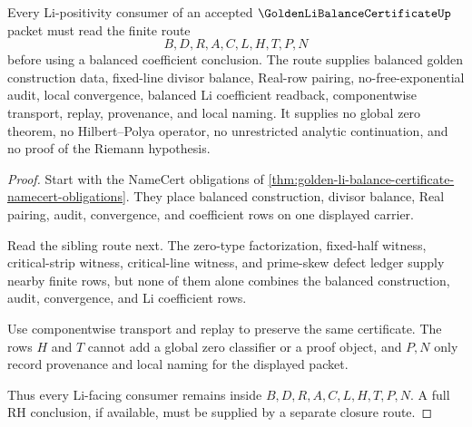 \begin{theorem}
\label{thm:golden-li-balance-certificate-coefficient-route}
Every Li-positivity consumer of an accepted $\GoldenLiBalanceCertificateUp$ packet must read the finite route
$$
B,D,R,A,C,L,H,T,P,N
$$
before using a balanced coefficient conclusion. The route supplies balanced golden construction data, fixed-line divisor balance, Real-row pairing, no-free-exponential audit, local convergence, balanced Li coefficient readback, componentwise transport, replay, provenance, and local naming. It supplies no global zero theorem, no Hilbert--Polya operator, no unrestricted analytic continuation, and no proof of the Riemann hypothesis.
\end{theorem}
\begin{proof}
Start with the NameCert obligations of \autoref{thm:golden-li-balance-certificate-namecert-obligations}. They place balanced construction, divisor balance, Real pairing, audit, convergence, and coefficient rows on one displayed carrier.

Read the sibling route next. The zero-type factorization, fixed-half witness, critical-strip witness, critical-line witness, and prime-skew defect ledger supply nearby finite rows, but none of them alone combines the balanced construction, audit, convergence, and Li coefficient rows.

Use componentwise transport and replay to preserve the same certificate. The rows $H$ and $T$ cannot add a global zero classifier or a proof object, and $P,N$ only record provenance and local naming for the displayed packet.

Thus every Li-facing consumer remains inside $B,D,R,A,C,L,H,T,P,N$. A full RH conclusion, if available, must be supplied by a separate closure route.
\end{proof}



